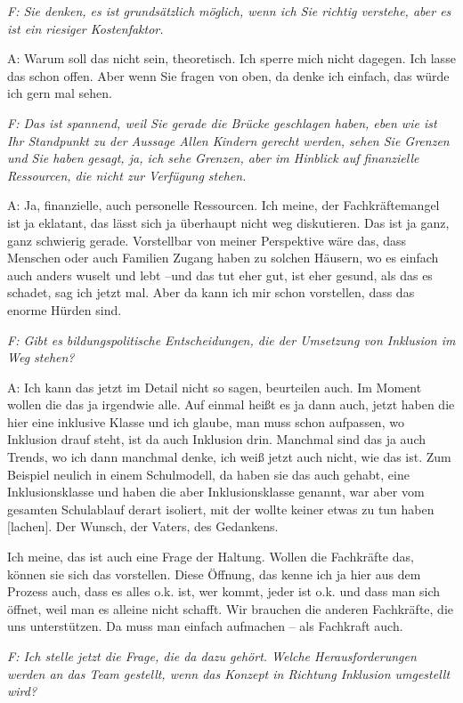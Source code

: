 \begin{linenumbers}
\emph{F: Sie denken, es ist grundsätzlich möglich, wenn ich Sie richtig verstehe, aber es ist ein riesiger Kostenfaktor.}

A: Warum soll das nicht sein, theoretisch. Ich sperre mich nicht dagegen. Ich lasse das schon offen. Aber wenn Sie fragen von oben, da denke ich einfach, das würde ich gern mal sehen.
 
\emph{F: Das ist spannend, weil Sie gerade die Brücke geschlagen haben, eben wie ist Ihr Standpunkt zu der Aussage Allen Kindern gerecht werden, sehen Sie Grenzen und Sie haben gesagt, ja, ich sehe Grenzen, aber im Hinblick auf finanzielle Ressourcen, die nicht zur Verfügung stehen.} 

A: Ja, finanzielle, auch personelle Ressourcen. Ich meine, der Fachkräftemangel ist ja eklatant, das lässt sich ja überhaupt nicht weg diskutieren. Das ist ja ganz, ganz schwierig gerade. Vorstellbar von meiner Perspektive wäre das, dass Menschen oder auch Familien Zugang haben zu solchen Häusern, wo es einfach auch anders wuselt und lebt  --und das tut eher gut, ist eher gesund, als das es schadet, sag ich jetzt mal. Aber da kann ich mir schon vorstellen, dass das enorme Hürden sind. 

\emph{F: Gibt es bildungspolitische Entscheidungen, die der Umsetzung von Inklusion im Weg stehen?} 

A: Ich kann das jetzt im Detail nicht so sagen, beurteilen auch. Im Moment wollen die das ja irgendwie alle. Auf einmal heißt es ja dann auch, jetzt haben die hier eine inklusive Klasse und ich glaube, man muss schon aufpassen, wo Inklusion drauf steht, ist da auch Inklusion drin. Manchmal sind das ja auch Trends, wo ich dann manchmal denke, ich weiß jetzt auch nicht, wie das ist. Zum Beispiel neulich in einem Schulmodell, da haben sie das auch gehabt, eine Inklusionsklasse und haben die aber Inklusionsklasse genannt, war aber vom gesamten Schulablauf derart isoliert, mit der wollte keiner etwas zu tun haben [lachen]. Der Wunsch, der Vaters, des Gedankens. 

Ich meine, das ist auch eine Frage der Haltung. Wollen die Fachkräfte das, können sie sich das vorstellen. Diese Öffnung, das kenne ich ja hier aus dem Prozess auch, dass es alles o.k. ist, wer kommt, jeder ist o.k. und dass man sich öffnet, weil man es alleine nicht schafft. Wir brauchen die anderen Fachkräfte, die uns unterstützen. Da muss man einfach aufmachen -- als Fachkraft auch.

\emph{F: Ich stelle jetzt die Frage, die da dazu gehört. Welche Herausforderungen werden an das Team gestellt, wenn das Konzept in Richtung Inklusion umgestellt wird?}


\end{linenumbers}
